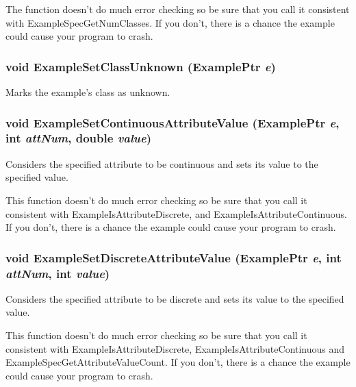 The function doesn't do much error checking so be sure that you call it consistent with Example\-Spec\-Get\-Num\-Classes. If you don't, there is a chance the example could cause your program to crash. 
\subsubsection{\setlength{\rightskip}{0pt plus 5cm}void Example\-Set\-Class\-Unknown ({\bf Example\-Ptr} {\em e})}\label{Example_8h_a16}


Marks the example's class as unknown. 

\subsubsection{\setlength{\rightskip}{0pt plus 5cm}void Example\-Set\-Continuous\-Attribute\-Value ({\bf Example\-Ptr} {\em e}, int {\em att\-Num}, double {\em value})}\label{Example_8h_a14}


Considers the specified attribute to be continuous and sets its value to the specified value. 

This function doesn't do much error checking so be sure that you call it consistent with Example\-Is\-Attribute\-Discrete, and Example\-Is\-Attribute\-Continuous. If you don't, there is a chance the example could cause your program to crash. 
\subsubsection{\setlength{\rightskip}{0pt plus 5cm}void Example\-Set\-Discrete\-Attribute\-Value ({\bf Example\-Ptr} {\em e}, int {\em att\-Num}, int {\em value})}\label{Example_8h_a13}


Considers the specified attribute to be discrete and sets its value to the specified value. 

This function doesn't do much error checking so be sure that you call it consistent with Example\-Is\-Attribute\-Discrete, Example\-Is\-Attribute\-Continuous and Example\-Spec\-Get\-Attribute\-Value\-Count. If you don't, there is a chance the example could cause your program to crash. 
